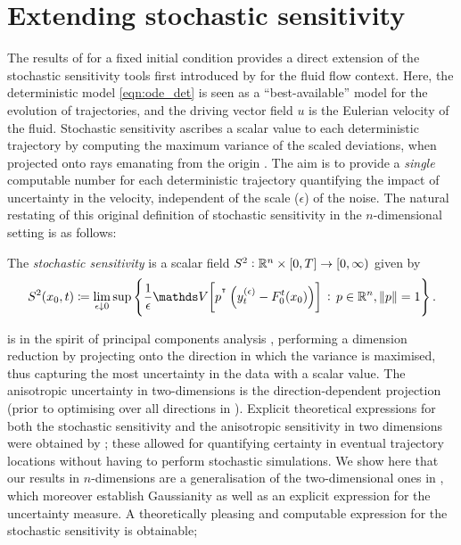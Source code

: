 \section{Extending stochastic sensitivity}\label{sec:theory_s2}
The results of  for a fixed initial condition provides a direct extension of the stochastic sensitivity tools first introduced by \citet{Balasuriya_2020_StochasticSensitivityComputable} for the fluid flow context.
Here, the deterministic model \eqref{eqn:ode_det} is seen as a ``best-available'' model for the evolution of trajectories, and the driving vector field \(u\) is the Eulerian velocity of the fluid.
Stochastic sensitivity ascribes a scalar value to each deterministic trajectory by computing the maximum variance of the scaled deviations, when projected onto rays emanating from the origin \cite{Balasuriya_2020_StochasticSensitivityComputable}.
The aim is to provide a \emph{single} computable number for each deterministic trajectory quantifying the impact of uncertainty in the velocity, independent of the scale (\(\epsilon\)) of the noise.
The natural restating of this original definition of stochastic sensitivity \cite{Balasuriya_2020_StochasticSensitivityComputable} in the $ n $-dimensional setting is as follows:

\begin{definition}\label{def:ss_Rn}
	The \emph{stochastic sensitivity} is a scalar field \(S^2: \mathbb{R}^n \times [0,T] \to \left[0, \infty\right)\) given by
	\begin{equation*}
		S^2\!\left(x_0,t\right) \coloneqq \lim_{\epsilon\downarrow 0}\sup\set{\frac{1}{\epsilon}\var{p^{\T}\left(y_t^{(\epsilon)} - F_0^t\!\left(x_0\right)\right)} \,: \, p \in \R^n, \, \norm{p} = 1}.
	\end{equation*}
\end{definition}

 is in the spirit of principal components analysis \cite{Jolliffe_2002_PrincipalComponentAnalysis}, performing a dimension reduction by projecting onto the direction in which the variance is maximised, thus capturing the most uncertainty in the data with a scalar value.
The anisotropic uncertainty in two-dimensions \cite{Balasuriya_2020_StochasticSensitivityComputable} is the direction-dependent projection (prior to optimising over all directions in ).
Explicit theoretical expressions for both the stochastic sensitivity and the anisotropic sensitivity in two dimensions were obtained by \citet{Balasuriya_2020_StochasticSensitivityComputable}; these allowed for quantifying certainty in eventual trajectory locations without having to perform stochastic simulations.
We show here that our results in \(n\)-dimensions are a generalisation of the two-dimensional ones in \cite{Balasuriya_2020_StochasticSensitivityComputable}, which moreover establish Gaussianity as well as an explicit expression for the uncertainty measure.
A theoretically pleasing and computable expression for the stochastic sensitivity is obtainable;


